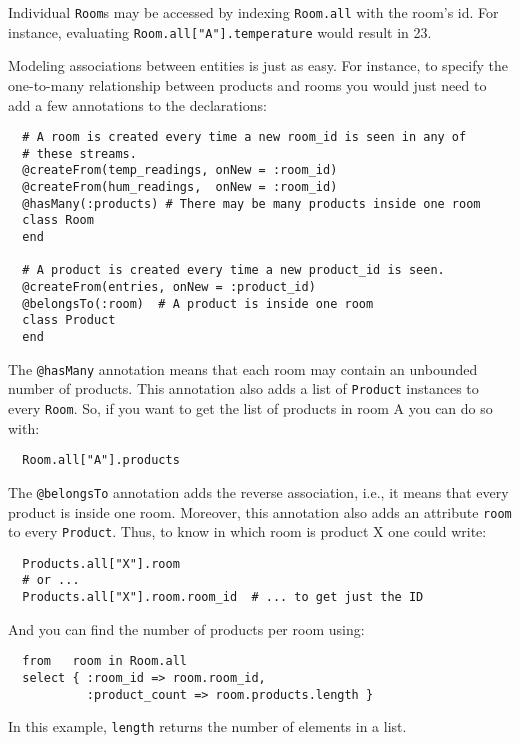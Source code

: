 \documentclass[a4,11pt]{report}
\begin{document}
Individual \verb=Room=s may be accessed by indexing \verb=Room.all=
with the room's id. For instance, evaluating
\verb=Room.all["A"].temperature= would result in 23.

Modeling associations between entities is just as easy. For instance,
to specify the one-to-many relationship between products and rooms you
would just need to add a few annotations to the declarations:

\begin{lstlisting}
  # A room is created every time a new room_id is seen in any of
  # these streams.
  @createFrom(temp_readings, onNew = :room_id)
  @createFrom(hum_readings,  onNew = :room_id)
  @hasMany(:products) # There may be many products inside one room
  class Room
  end

  # A product is created every time a new product_id is seen.
  @createFrom(entries, onNew = :product_id)
  @belongsTo(:room)  # A product is inside one room
  class Product
  end
\end{lstlisting}

The \verb=@hasMany= annotation means that each room may contain an
unbounded number of products. This annotation also adds a list of
\verb=Product= instances to every \verb=Room=. So, if you want to get
the list of products in room A you can do so with:

\begin{lstlisting}
  Room.all["A"].products
\end{lstlisting}

The \verb=@belongsTo= annotation adds the reverse association, i.e.,
it means that every product is inside one room. Moreover, this
annotation also adds an attribute \verb=room= to every
\verb=Product=. Thus, to know in which room is product X one could
write:

\begin{lstlisting}
  Products.all["X"].room
  # or ...
  Products.all["X"].room.room_id  # ... to get just the ID
\end{lstlisting}

And you can find the number of products per room using:

\begin{lstlisting}
  from   room in Room.all
  select { :room_id => room.room_id,
           :product_count => room.products.length }
\end{lstlisting}

In this example, \verb=length= returns the number of elements in a
list.
\end{document}

